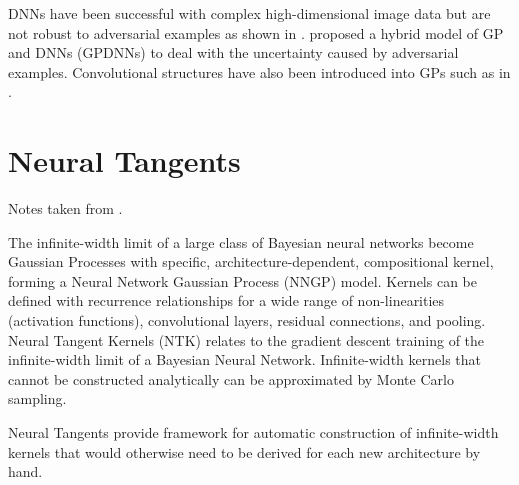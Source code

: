 \documentclass[twoside,11pt]{article}
\begin{document}
DNNs have been successful with complex high-dimensional image data but are not robust to adversarial examples as shown in \cite{szegedy2013intriguing}.
\cite{bradshaw2017adversarial} proposed a hybrid model of GP and DNNs (GPDNNs) to deal with the uncertainty caused by adversarial examples.
Convolutional structures have also been introduced into GPs such as in \cite{van2017convolutional}.


\section{Neural Tangents}\label{sec:neural-tangents}
Notes taken from \cite{novak2019neural}.

The infinite-width limit of a large class of Bayesian neural networks become Gaussian Processes with specific, architecture-dependent, compositional kernel, forming a Neural Network Gaussian Process (NNGP) model.
Kernels can be defined with recurrence relationships for a wide range of non-linearities (activation functions), convolutional layers, residual connections, and pooling.
Neural Tangent Kernels (NTK) relates to the gradient descent training of the infinite-width limit of a Bayesian Neural Network.
Infinite-width kernels that cannot be constructed analytically can be approximated by Monte Carlo sampling.

Neural Tangents provide framework for automatic construction of infinite-width kernels that would otherwise need to be derived for each new architecture by hand.





\newpage



\end{document}
